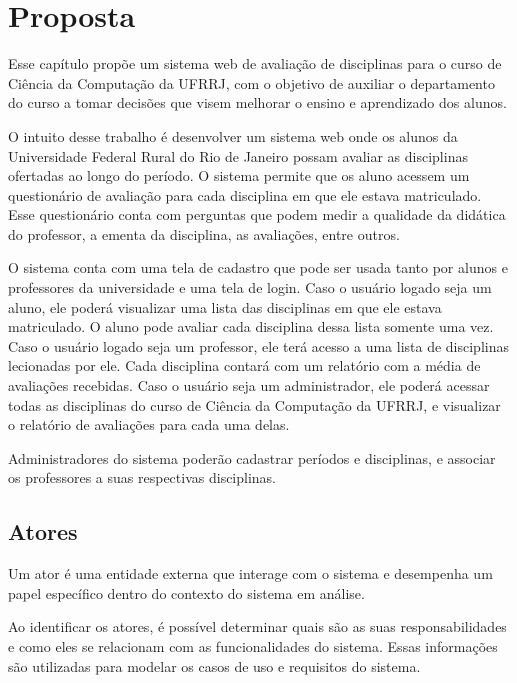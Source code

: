 

\section{Proposta}

Esse capítulo propõe um sistema web de avaliação de disciplinas para o curso de Ciência da Computação da UFRRJ, com o objetivo de auxiliar o departamento do curso a tomar decisões que visem melhorar o ensino e aprendizado dos alunos.

O intuito desse trabalho é desenvolver um sistema web onde os alunos da Universidade Federal Rural do Rio de Janeiro possam avaliar as disciplinas ofertadas ao longo do período. O sistema permite que os aluno acessem um questionário de avaliação para cada disciplina em que ele estava matriculado. Esse questionário conta com perguntas que podem medir a qualidade da didática do professor, a ementa da disciplina, as avaliações, entre outros.

O sistema conta com uma tela de cadastro que pode ser usada tanto por alunos e professores da universidade e uma tela de login. Caso o usuário logado seja um aluno, ele poderá visualizar uma lista das disciplinas em que ele estava matriculado. O aluno pode avaliar cada disciplina dessa lista somente uma vez. Caso o usuário logado seja um professor, ele terá acesso a uma lista de disciplinas lecionadas por ele. Cada disciplina contará com um relatório com a média de avaliações recebidas. Caso o usuário seja um administrador, ele poderá acessar todas as disciplinas do curso de Ciência da Computação da UFRRJ, e visualizar o relatório de avaliações para cada uma delas.

Administradores do sistema poderão cadastrar períodos e disciplinas, e associar os professores a suas respectivas disciplinas. 

\subsection{Atores}
Um ator é uma entidade externa que interage com o sistema e desempenha um papel específico dentro do contexto do sistema em análise.

Ao identificar os atores, é possível determinar quais são as suas responsabilidades e como eles se relacionam com as funcionalidades do sistema. Essas informações são utilizadas para modelar os casos de uso e requisitos do sistema.

